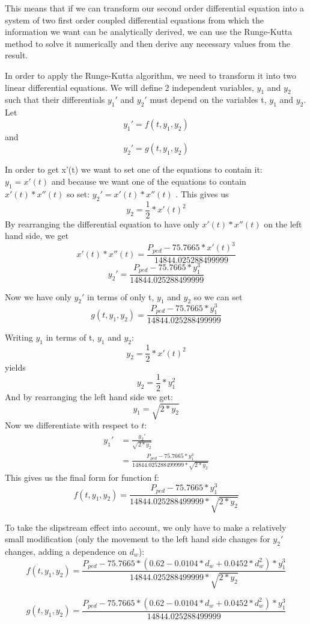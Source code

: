\documentclass[10pt, a4paper]{report}
\begin{document}
This means that if we can transform our second order differential equation into a system of two first order coupled differential equations from which the information we want can be analytically derived, we can use the Runge-Kutta method to solve it numerically and then derive any necessary values from the result. \newline \par

In order to apply the Runge-Kutta algorithm, we need to transform it into two linear differential equations. We will define 2 independent variables, $y_1$ and $y_2$ such that their differentials $y_1'$ and $y_2'$ must depend on the variables t, $y_1$ and $y_2$. Let
$$ y_1' = f( t, y_1, y_2 )$$ and $$y_2' = g( t, y_1, y_2 )$$

In order to get x'(t) we want to set one of the equations to contain it: $y_1 = x'(t)$ and because we want one of the equations to contain $x'(t) * x''(t) $ so set: $y_2' = x'( t ) * x''( t )$ .
This gives us $$ y_{2} = \frac{1}{2} * x'(t)^2 $$
By rearranging the differential equation to have only $ x'( t ) * x''( t )$ on the left hand side, we get
$$ x'( t ) * x''( t ) = \frac{P_{ped} - 75.7665 * x'( t ) ^ 3}{14844.025288499999}$$
$$ y_2' = \frac{P_{ped} - 75.7665 * y_1 ^ 3}{14844.025288499999}$$

Now we have only $y_2'$ in terms of only t, $y_1$ and $y_2$ so we can set $$ g( t, y_1, y_2 ) = \frac{P_{ped} - 75.7665 * y_1 ^ 3}{14844.025288499999}$$

Writing $y_1$ in terms of t, $y_1$ and $y_2$: $$y_2 = \frac{1}{2} * x'(t)^2$$ yields $$y_2 = \frac{1}{2} * y_1^2$$
And by rearranging the left hand side we get:
$$y_1 = \sqrt{2 * y_2}$$
Now we differentiate with respect to $t$:
\begin{align*}
y_1' & = \frac{y_2'}{\sqrt{2 * y_2}}\\
& = \frac{P_{ped} - 75.7665 * y_1 ^ 3}{14844.025288499999 * \sqrt{2 * y_2}}
\end{align*}
This gives us the final form for function f:
$$ f(t, y_1, y_2) = \frac{P_{ped} - 75.7665 * y_1 ^ 3}{14844.025288499999 * \sqrt{2 * y_2}}$$

To take the slipstream effect into account, we only have to make a relatively small modification (only the movement to the left hand side changes for $y_2'$ changes, adding a dependence on $d_w$):
$$ f(t, y_1, y_2) = \frac{P_{ped} - 75.7665 * (0.62 - 0.0104*d_w + 0.0452*d_w^2) * y_1 ^ 3}{14844.025288499999 * \sqrt{2 * y_2}}$$

$$ g( t, y_1, y_2 ) = \frac{P_{ped} - 75.7665 * (0.62 - 0.0104*d_w + 0.0452*d_w^2) * y_1 ^ 3}{14844.025288499999}$$ \\
\end{document}

